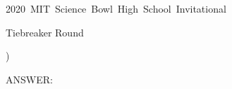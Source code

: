 \documentclass[12pt]{article}
\begin{document}
\begin{center}
  \begin{LARGE}
    {\selectfont
      \mbox{2020 MIT Science Bowl High School Invitational}
      \vspace{10pt} \par Tiebreaker Round \roundnumber
    }
  \end{LARGE}
\end{center}

{
  \filbreak

  \begin{center}
    {\textbf{\MakeUppercase{\tb}}}
  \end{center}

  \thecsvrow)  \MakeUppercase{\cat} \textit{\mcsa} \question

  \vspace{5pt}
  ANSWER: \answer \vspace{15pt}

  \hrulefill
}
\end{document}
